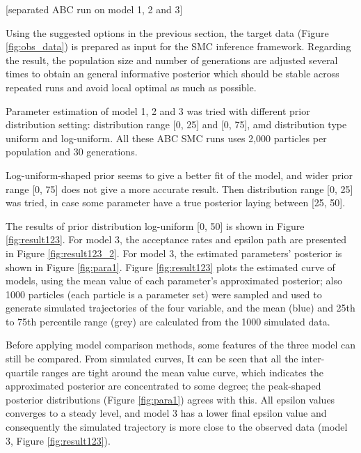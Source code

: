 \documentclass[12pt,a4paper]{report}
\begin{document}
[separated ABC run on model 1, 2 and 3]

Using the suggested options in the previous section, the target data (Figure \ref{fig:obs_data}) is prepared as input for the SMC inference framework. Regarding the result, the population size and number of generations are adjusted several times to obtain an general informative posterior which should be stable across repeated runs and avoid local optimal as much as possible.

Parameter estimation of model 1, 2 and 3 was tried with different prior distribution setting: distribution range [0, 25] and [0, 75], amd distribution type uniform and log-uniform. All these ABC SMC runs uses 2,000 particles per population and 30 generations. 

Log-uniform-shaped prior seems to give a better fit of the model, and wider prior range [0, 75] does not give a more accurate result. Then distribution range [0, 25] was tried, in case some parameter have a true posterior laying between [25, 50]. 

The results of prior distribution log-uniform [0, 50] is shown in Figure \ref{fig:result123}. For model 3, the acceptance rates and epsilon path are presented in Figure \ref{fig:result123_2}. For model 3, the estimated parameters' posterior is shown in Figure \ref{fig:para1}. Figure \ref{fig:result123} plots the estimated curve of models, using the mean value of each parameter's approximated posterior; also 1000 particles (each particle is a parameter set) were sampled and used to generate simulated trajectories of the four variable, and the mean (blue) and 25th to 75th percentile range (grey) are calculated from the 1000 simulated data.

Before applying model comparison methods, some features of the three model can still be compared. From simulated curves, It can be seen that all the inter-quartile ranges are tight around the mean value curve, which indicates the approximated posterior are concentrated to some degree; the peak-shaped posterior distributions (Figure \ref{fig:para1}) agrees with this. All epsilon values converges to a steady level, and model 3 has a lower final epsilon value and consequently the simulated trajectory is more close to the observed data (model 3, Figure \ref{fig:result123}).
\end{document}
